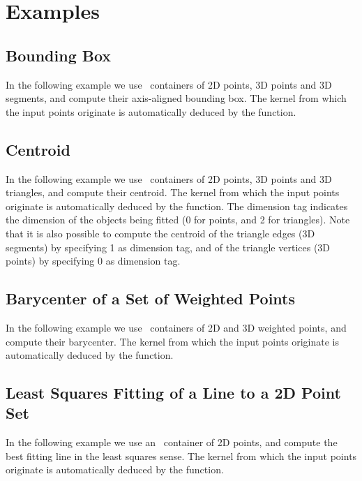 

\minitoc




\section{Examples\label{subsec:pca_examples}}

\subsection{Bounding Box}
In the following example we use \stl\ containers of 2D points, 3D points and 3D segments, and compute their axis-aligned bounding box. The kernel from which the input points originate is automatically deduced by the function.

\subsection{Centroid}
In the following example we use \stl\ containers of 2D points, 3D points and 3D triangles, and compute their centroid. The kernel from which the input points originate is automatically deduced by the function. The dimension tag indicates the dimension of the objects being fitted (0 for points, and 2 for triangles). Note that it is also possible to compute the centroid of the triangle edges (3D segments) by specifying 1 as dimension tag, and of the triangle vertices (3D points) by specifying 0 as dimension tag.

\subsection{Barycenter of a Set of Weighted Points}
In the following example we use \stl\ containers of 2D and 3D weighted points, and compute their barycenter. The kernel from which the input points originate is automatically deduced by the function.

\subsection{Least Squares Fitting of a Line to a 2D Point Set}
In the following example we use an \stl\ container of 2D points, and compute the best fitting line in the least squares sense. The kernel from which the input points originate is automatically deduced by the function.


